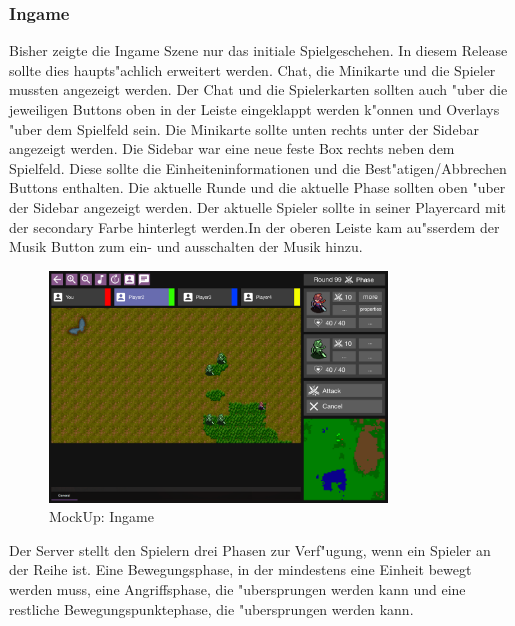 \documentclass[12pt, titlepage]{scrartcl}
\newcounter{subsubsubsection}[subsubsection]
\begin{document}
		    \subsubsection{Ingame}
		        Bisher zeigte die Ingame Szene nur das initiale Spielgeschehen. In diesem Release sollte dies haupts"achlich erweitert werden. Chat, die Minikarte und die Spieler mussten angezeigt werden. Der Chat und die Spielerkarten sollten auch "uber die jeweiligen Buttons oben in der Leiste eingeklappt werden k"onnen und Overlays "uber dem Spielfeld sein. Die Minikarte sollte unten rechts unter der Sidebar angezeigt werden. Die Sidebar war eine neue feste Box rechts neben dem Spielfeld. Diese sollte die Einheiteninformationen und die Best"atigen/Abbrechen Buttons enthalten. Die aktuelle Runde und die aktuelle Phase sollten oben "uber der Sidebar angezeigt werden. Der aktuelle Spieler sollte in seiner Playercard mit der secondary Farbe hinterlegt werden.In der oberen Leiste kam au"sserdem der Musik Button zum ein- und ausschalten der Musik hinzu. \\
		        \begin{figure}[H] 
    				\centering
    				\includegraphics[width=0.8\textwidth]{images/mockUps/Ingame.png}
    				\caption{MockUp: Ingame}
    				\label{Ingame_View}
			    \end{figure}
			        Der Server stellt den Spielern drei Phasen zur Verf"ugung, wenn ein Spieler an der Reihe ist. Eine Bewegungsphase, in der mindestens eine Einheit bewegt werden muss, eine Angriffsphase, die "ubersprungen werden kann und eine restliche Bewegungspunktephase, die "ubersprungen werden kann. \\
\end{document}
